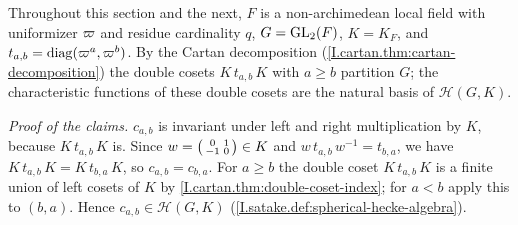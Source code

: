 Throughout this section and the next, $F$ is a non-archimedean local field with uniformizer $\varpi$ and residue
cardinality $q$, $G=\mathrm{GL}_2(F)$, $K=K_F$, and $t_{a,b}=\operatorname{diag}(\varpi^a,\varpi^b)$. By the Cartan decomposition
(\cref{I.cartan.thm:cartan-decomposition}) the double cosets $K\,t_{a,b}\,K$ with $a\ge b$ partition $G$; the
characteristic functions of these double cosets are the natural basis of $\mathcal H(G,K)$.

\begin{definition}
\end{definition}

\noindent\emph{Proof of the claims.} $c_{a,b}$ is invariant under left and right multiplication by $K$, because
$K\,t_{a,b}\,K$ is. Since $w=\begin{psmallmatrix}0&1\\-1&0\end{psmallmatrix}\in K$ and
$w\,t_{a,b}\,w^{-1}=t_{b,a}$, we have $K\,t_{a,b}\,K=K\,t_{b,a}\,K$, so $c_{a,b}=c_{b,a}$. For $a\ge b$ the double
coset $K\,t_{a,b}\,K$ is a finite union of left cosets of $K$ by \cref{I.cartan.thm:double-coset-index}; for $a<b$
apply this to $(b,a)$. Hence $c_{a,b}\in\mathcal H(G,K)$ (\cref{I.satake.def:spherical-hecke-algebra}).

